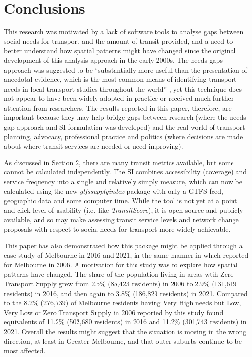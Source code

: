 \documentclass[preprint, 3p,
authoryear]{elsarticle} %
\begin{document}
\section{Conclusions}\label{conclusions}

This research was motivated by a lack of software tools to analyse gaps
between social needs for transport and the amount of transit provided,
and a need to better understand how spatial patterns might have changed
since the original development of this analysis approach in the early
2000s. The needs-gaps approach was suggested to be ``substantially more
useful than the presentation of anecdotal evidence, which is the most
common means of identifying transport needs in local transport studies
throughout the world'' \citep{currie2010identifying}, yet this technique
does not appear to have been widely adopted in practice or received much
further attention from researchers. The results reported in this paper,
therefore, are important because they may help bridge gaps between
research (where the needs-gap approach and SI formulation was developed)
and the real world of transport planning, advocacy, professional
practice and politics (where decisions are made about where transit
services are needed or need improving).

As discussed in Section 2, there are many transit metrics available, but
some cannot be calculated independently. The SI combines accessibility
(coverage) and service frequency into a single and relatively simply
measure, which can now be calculated using the new
\emph{gtfssupplyindex} package with only a GTFS feed, geographic data
and some computer time. While the tool is not yet at a point and click
level of usability (i.e.~like \emph{TransitScore}), it is open source
and publicly available, and so may make assessing transit service levels
and network change proposals with respect to social needs for transport
more widely achievable.

This paper has also demonstrated how this package might be applied
through a case study of Melbourne in 2016 and 2021, in the same manner
in which \citet{currie2010identifying} reported for Melbourne in 2006. A
motivation for this study was to explore how spatial patterns have
changed. The share of the population living in areas wtih Zero Transport
Supply grew from 2.5\% (85,423 residents) in 2006 to 2.9\% (131,619
residents) in 2016, and then again to 3.8\% (186,829 residents) in 2021.
Compared to the 8.2\% (276,739) of Melbourne residents having Very High
needs but Low, Very Low or Zero Transport Supply in 2006 reported by
\citet{currie2010identifying} this study found equivalents of 11.2\%
(502,680 residents) in 2016 and 11.2\% (301,743 residents) in 2021.
Overall the results might suggest that the situation is moving in the
wrong direction, at least in Greater Melbourne, and that outer suburbs
continue to be most affected.
\end{document}
